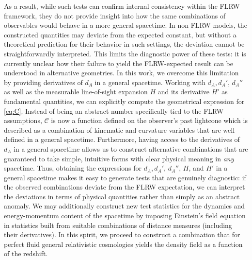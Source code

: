 \documentclass[reprint,aps,prd,nofootinbib,a4paper,10pt,twocolumn,superscriptaddress]{revtex4-2}
\begin{document}
As a result, while such tests can confirm internal consistency within the FLRW framework, they do not provide insight into how the same combinations of observables would behave in a more general spacetime. In non-FLRW models, the constructed quantities may deviate from the expected constant, but without a theoretical prediction for their behavior in such settings, the deviation cannot be straightforwardly interpreted. This limits the diagnostic power of these tests: it is currently unclear how their failure to yield the FLRW-expected result can be understood in alternative geometries. In this work, we overcome this limitation by providing derivatives of $d_A$ in a general spacetime. Working with $d_A, d_A'$, $d_A''$ as well as the measurable line-of-sight expansion $H$ and its derivative $H'$ as fundamental quantities, we can explicitly compute the geometrical expression for \eqref{eq:C}.
\newline\indent
Instead of being an abstract number specifically tied to the FLRW assumptions, $\mathcal{C}$ is now a function defined on the observer's past lightcone which is described as a combination of kinematic and curvature variables that are well defined in a general spacetime. Furthermore, having access to the derivatives of $d_A$ in a general spacetime allows us to construct alternative combinations that are guaranteed to take simple, intuitive forms with clear physical meaning in \emph{any} spacetime. Thus, obtaining the expressions for $d_A, d_A'$, $d_A''$, $H$, and $H'$ in a general spacetime makes it easy to generate tests that are genuinely diagnostic: if the observed combinations deviate from the FLRW expectation, we can interpret the deviations in terms of physical quantities rather than simply as an abstract anomaly.
\newline\indent
We may additionally construct new test statistics for the dynamics and energy-momentum content of the spacetime by imposing Einstein's field equation in statistics built from suitable combinations of distance measures (including their derivatives). In this spirit, we proceed to construct a combination that for perfect fluid general relativistic cosmologies yields the density field as a function of the redshift.
\end{document}
